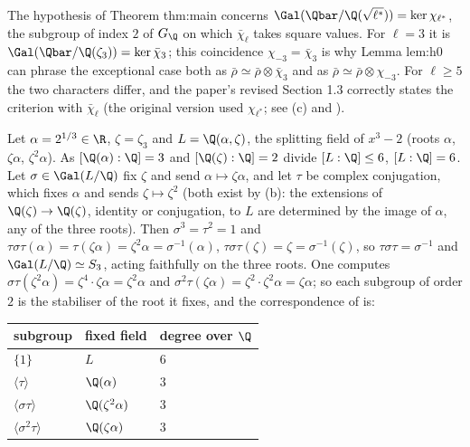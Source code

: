 \begin{paperlink}
The hypothesis of Theorem thm:main concerns $\Gal(\Qbar/\Q(\sqrt{\ell^*}))=\ker\chi_{\ell^*}$, the subgroup of index $2$ of $G_\Q$ on which $\bar\chi_\ell$ takes square
values. For $\ell=3$ it is $\Gal(\Qbar/\Q(\zeta_3))=\ker\bar\chi_3$; this coincidence $\chi_{-3}=\bar\chi_3$ is why Lemma lem:h0 can phrase the exceptional case both as
$\bar\rho\simeq\bar\rho\otimes\bar\chi_3$ and as $\bar\rho\simeq\bar\rho\otimes\chi_{-3}$. For $\ell\ge5$ the two characters differ, and the paper's revised
Section 1.3 correctly states the criterion with $\bar\chi_\ell$ (the original version used $\chi_{\ell^*}$; see (c) and
).
\end{paperlink}

\begin{example}\label{ex:galois:x3minus2}
Let $\alpha=2^{1/3}\in\R$, $\zeta=\zeta_3$ and $L=\Q(\alpha,\zeta)$, the splitting field of $x^3-2$ (roots $\alpha$, $\zeta\alpha$, $\zeta^2\alpha$). As $[\Q(\alpha):\Q]=3$
and $[\Q(\zeta):\Q]=2$ divide $[L:\Q]\le6$, $[L:\Q]=6$. Let $\sigma\in\Gal(L/\Q)$ fix $\zeta$ and send $\alpha\mapsto\zeta\alpha$, and let $\tau$ be complex conjugation,
which fixes $\alpha$ and sends $\zeta\mapsto\zeta^2$ (both exist by (b): the extensions of $\Q(\zeta)\to\Q(\zeta)$, identity or
conjugation, to $L$ are determined by the image of $\alpha$, any of the three roots). Then $\sigma^3=\tau^2=1$ and $\tau\sigma\tau(\alpha)=\tau(\zeta\alpha)=\zeta^2\alpha=
\sigma^{-1}(\alpha)$, $\tau\sigma\tau(\zeta)=\zeta=\sigma^{-1}(\zeta)$, so $\tau\sigma\tau=\sigma^{-1}$ and $\Gal(L/\Q)\simeq S_3$, acting faithfully on the three
roots. One computes $\sigma\tau(\zeta^2\alpha)=\zeta^4\cdot\zeta\alpha=\zeta^2\alpha$ and $\sigma^2\tau(\zeta\alpha)=\zeta^2\cdot\zeta^2\alpha=\zeta\alpha$; so each subgroup of
order $2$ is the stabiliser of the root it fixes, and the correspondence of  is:
\begin{center}
\begin{tabular}{lll}
\toprule
subgroup & fixed field & degree over $\Q$\\
\midrule
$\{1\}$ & $L$ & $6$\\
$\langle\tau\rangle$ & $\Q(\alpha)$ & $3$\\
$\langle\sigma\tau\rangle$ & $\Q(\zeta^2\alpha)$ & $3$\\
$\langle\sigma^2\tau\rangle$ & $\Q(\zeta\alpha)$ & $3$\\

\end{tabular}
\end{center}
\end{example}
